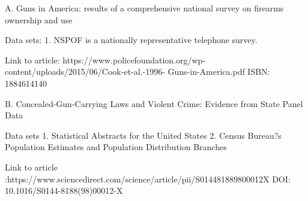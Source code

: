 A. Guns in America: results of a comprehensive national survey on firearms ownership and use

	Data sets: 
		1. NSPOF is a nationally representative telephone survey. 

	Link to article: https://www.policefoundation.org/wp-content/uploads/2015/06/Cook-et-al.-1996-	
	Guns-in-America.pdf
		ISBN: 1884614140

B. Concealed-Gun-Carrying Laws and Violent Crime: Evidence from State Panel Data

	Data sets
		1. Statistical Abstracts for the United States
		2. Census Bureau?s Population Estimates and Population Distribution Branches
	
	Link to article :https://www.sciencedirect.com/science/article/pii/S014481889800012X
	DOI: 10.1016/S0144-8188(98)00012-X